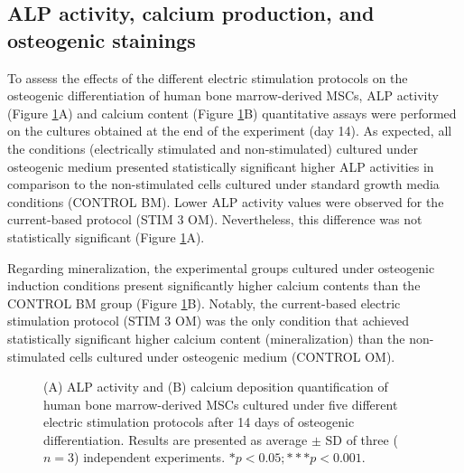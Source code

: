 \subsection{\acs{ALP} activity, calcium production, and osteogenic stainings} 
To assess the effects of the different electric stimulation protocols on the osteogenic differentiation of human bone marrow-derived \ac{MSCs}, \acs{ALP} activity (Figure \ref{fig4d8}A) and calcium content (Figure \ref{fig4d8}B) quantitative assays were performed on the cultures obtained at the end of the experiment (day 14). As expected, all the conditions (electrically stimulated and non-stimulated) cultured under osteogenic medium presented statistically significant higher \ac{ALP} activities in comparison to the non-stimulated cells cultured under standard growth media conditions (CONTROL BM). Lower \ac{ALP} activity values were observed for the current-based protocol (STIM 3 OM). Nevertheless, this difference was not statistically significant (Figure \ref{fig4d8}A). 

Regarding mineralization, the experimental groups cultured under osteogenic induction conditions present significantly higher calcium contents than the CONTROL BM group (Figure \ref{fig4d8}B). Notably, the current-based electric stimulation protocol (STIM 3 OM) was the only condition that achieved statistically significant higher calcium content (mineralization) than the non-stimulated cells cultured under osteogenic medium (CONTROL OM).

\begin{figure}
\caption{(A) \ac{ALP} activity and (B) calcium deposition quantification of human bone marrow-derived \ac{MSCs} cultured under five different electric stimulation protocols after 14 days of osteogenic differentiation. Results are presented as average $\pm$ SD of three ($n=3$) independent experiments. $*p < 0.05; ***p < 0.001$.}
\label{fig4d8}
\end{figure}

